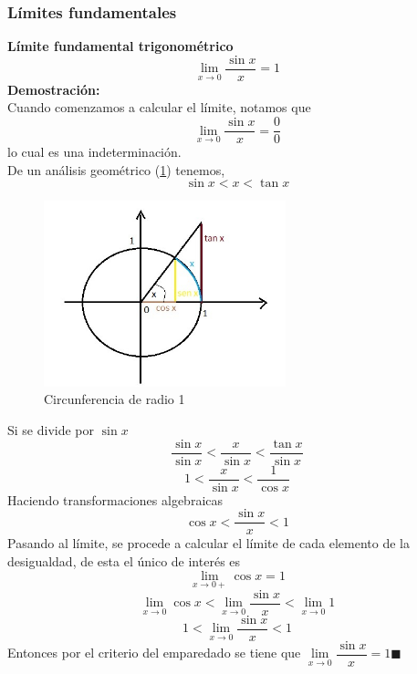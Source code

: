 \documentclass[10pt,twoside]{SelfArx} %
\begin{document}
\subsubsection{Límites fundamentales}

\textbf{Límite fundamental trigonométrico}\\
\[ \lim\limits_{x\rightarrow0}\dfrac{\sin x}{x}=1 \]
\textbf{Demostración:}\\
Cuando comenzamos a calcular el límite, notamos que
\[ \lim\limits_{x\rightarrow0}\dfrac{\sin x}{x}=\dfrac{0}{0} \]
lo cual es una indeterminación.\\
De un análisis geométrico (\ref{limite_fundamental}) tenemos,
\begin{equation}
 \sin x< x<\tan x 
\end{equation}

\begin{figure}[h]
	\centering
	\includegraphics[width=7cm]{limite_fundamental}
	\caption{Circunferencia de radio 1}
	\label{limite_fundamental}
\end{figure}
Si se divide por $ \sin x $
\begin{equation}
 \dfrac{\sin x}{\sin x}< \dfrac{x}{\sin x}<\dfrac{\tan x }{\sin x}
\end{equation}
\begin{equation}
1< \dfrac{x}{\sin x}<\dfrac{1}{\cos x}
\end{equation}
Haciendo transformaciones algebraicas
\begin{equation}
\cos x<\dfrac{\sin x}{x}<1
\end{equation}
Pasando al límite, se procede a calcular el límite de cada elemento de la desigualdad, de esta el único de interés es 
\[ \lim\limits_{x\rightarrow0+}\cos x =1 \]
\begin{equation}
\lim\limits_{x\rightarrow0}\cos x
<\lim\limits_{x\rightarrow0}\dfrac{\sin x}{x}
<\lim\limits_{x\rightarrow0}1
\end{equation}
\begin{equation}
1<\lim\limits_{x\rightarrow0}\dfrac{\sin x}{x}<1
\end{equation}
Entonces por el criterio del emparedado se tiene que $ \lim\limits_{x\rightarrow0}\dfrac{\sin x}{x}=1 \blacksquare$\\
\end{document}
